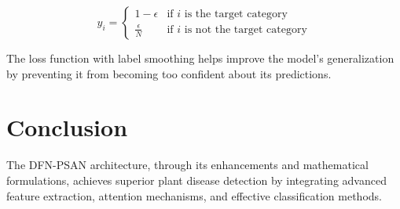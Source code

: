 \documentclass[12pt,a4paper]{article}
\begin{document}
\begin{equation}
y_i = 
\begin{cases} 
1 - \epsilon & \text{if } i \text{ is the target category} \\
\frac{\epsilon}{N} & \text{if } i \text{ is not the target category}
\end{cases}
\end{equation}

The loss function with label smoothing helps improve the model's generalization by preventing it from becoming too confident about its predictions.

\section{Conclusion}
The DFN-PSAN architecture, through its enhancements and mathematical formulations, achieves superior plant disease detection by integrating advanced feature extraction, attention mechanisms, and effective classification methods.
\end{document}

